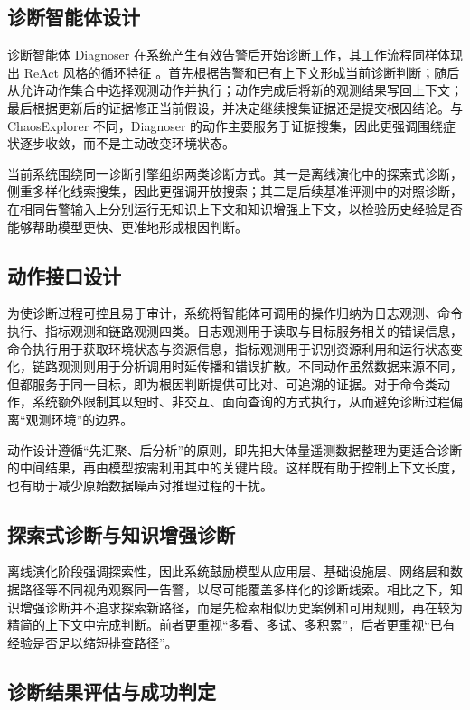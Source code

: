\subsection{诊断智能体设计}

诊断智能体 Diagnoser 在系统产生有效告警后开始诊断工作，其工作流程同样体现出 ReAct 风格的循环特征 \cite{yao2022react}。首先根据告警和已有上下文形成当前诊断判断；随后从允许动作集合中选择观测动作并执行；动作完成后将新的观测结果写回上下文；最后根据更新后的证据修正当前假设，并决定继续搜集证据还是提交根因结论。与 ChaosExplorer 不同，Diagnoser 的动作主要服务于证据搜集，因此更强调围绕症状逐步收敛，而不是主动改变环境状态。

当前系统围绕同一诊断引擎组织两类诊断方式。其一是离线演化中的探索式诊断，侧重多样化线索搜集，因此更强调开放搜索；其二是后续基准评测中的对照诊断，在相同告警输入上分别运行无知识上下文和知识增强上下文，以检验历史经验是否能够帮助模型更快、更准地形成根因判断。

\subsection{动作接口设计}

为使诊断过程可控且易于审计，系统将智能体可调用的操作归纳为日志观测、命令执行、指标观测和链路观测四类。日志观测用于读取与目标服务相关的错误信息，命令执行用于获取环境状态与资源信息，指标观测用于识别资源利用和运行状态变化，链路观测则用于分析调用时延传播和错误扩散。不同动作虽然数据来源不同，但都服务于同一目标，即为根因判断提供可比对、可追溯的证据。对于命令类动作，系统额外限制其以短时、非交互、面向查询的方式执行，从而避免诊断过程偏离“观测环境”的边界。

动作设计遵循“先汇聚、后分析”的原则，即先把大体量遥测数据整理为更适合诊断的中间结果，再由模型按需利用其中的关键片段。这样既有助于控制上下文长度，也有助于减少原始数据噪声对推理过程的干扰。

\subsection{探索式诊断与知识增强诊断}

离线演化阶段强调探索性，因此系统鼓励模型从应用层、基础设施层、网络层和数据路径等不同视角观察同一告警，以尽可能覆盖多样化的诊断线索。相比之下，知识增强诊断并不追求探索新路径，而是先检索相似历史案例和可用规则，再在较为精简的上下文中完成判断。前者更重视“多看、多试、多积累”，后者更重视“已有经验是否足以缩短排查路径”。

\subsection{诊断结果评估与成功判定}

